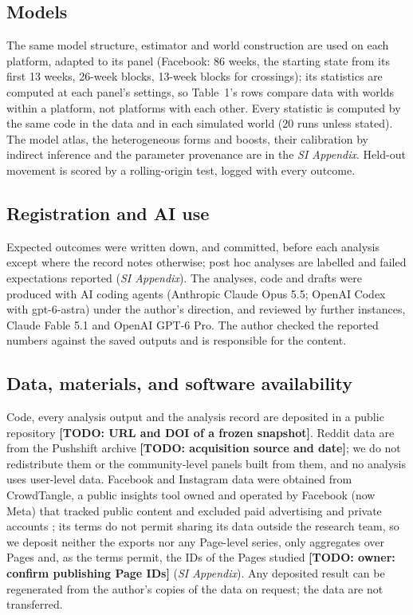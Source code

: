 \documentclass[9pt,twocolumn,twoside]{pnas-new}
\newcommand{\todo}[1]{\textcolor{red!65!black}{\textbf{[TODO: #1]}}}
\newif\iffinal \finalfalse
\begin{document}
{\subsection*{Models}
The same model structure, estimator and world construction are used on each platform, adapted to its panel (Facebook: 86 weeks, the starting state from its first 13 weeks, 26-week blocks, 13-week blocks for crossings); its statistics are computed at each panel's settings, so Table~1's rows compare data with worlds within a platform, not platforms with each other. Every statistic is computed by the same code in the data and in each simulated world (20 runs unless stated). The model atlas, the heterogeneous forms and boosts, their calibration by indirect inference \cite{gourieroux1993,guvenen2014} and the parameter provenance are in the \textit{SI Appendix}. Held-out movement is scored by a rolling-origin test, logged with every outcome.

\subsection*{Registration and AI use}
Expected outcomes were written down, and committed, before each analysis except where the record notes otherwise; post hoc analyses are labelled and failed expectations reported (\textit{SI Appendix}). The analyses, code and drafts were produced with AI coding agents (Anthropic Claude Opus 5.5; OpenAI Codex with gpt-6-astra) under the author's direction, and reviewed by further instances, Claude Fable 5.1 and OpenAI GPT-6 Pro. The author checked the reported numbers against the saved outputs and is responsible for the content.

\subsection*{Data, materials, and software availability}
Code, every analysis output and the analysis record are deposited in a public repository \todo{URL and DOI of a frozen snapshot}. Reddit data are from the Pushshift archive \cite{baumgartner2020} \todo{acquisition source and date}; we do not redistribute them or the community-level panels built from them, and no analysis uses user-level data. Facebook and Instagram data were obtained from CrowdTangle, a public insights tool owned and operated by Facebook (now Meta) that tracked public content and excluded paid advertising and private accounts \cite{crowdtangle}; its terms do not permit sharing its data outside the research team, so we deposit neither the exports nor any Page-level series, only aggregates over Pages and, as the terms permit, the IDs of the Pages studied \todo{owner: confirm publishing Page IDs} (\textit{SI Appendix}). Any deposited result can be regenerated from the author's copies of the data on request; the data are not transferred.
}
\showmatmethods{}

\acknow{\todo{Acknowledgements.} \iffinal B. Rogers co-authored the analysis of web traffic in ref.~\cite{hindman2018} from which this work descends. \fi}
\showacknow{}


\end{document}
